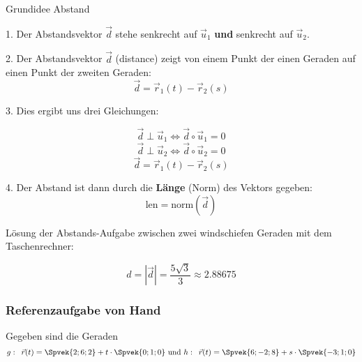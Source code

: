 \begin{rezept}{Grundidee Abstand}{}

  1. Der Abstandsvektor $\vec{d}$ stehe senkrecht auf $\vec{u}_1$
  \textbf{und} senkrecht auf $\vec{u}_2$.

  2. Der Abstandsvektor $\vec{d}$ (distance) zeigt von einem Punkt der einen Geraden auf
  einen Punkt der zweiten Geraden: $$\vec{d}=\vec{r}_1(t) - \vec{r}_2(s)$$

  3. Dies ergibt uns drei Gleichungen:

  $$\vec{d}\perp\vec{u}_1 \Longleftrightarrow{}  \vec{d}\circ{}\vec{u}_1 = 0$$
  $$\vec{d}\perp\vec{u}_2 \Longleftrightarrow{}  \vec{d}\circ{}\vec{u}_2 = 0$$
  $$\vec{d}=\vec{r}_1(t)-\vec{r}_2(s)$$

  4. Der Abstand ist dann durch die \textbf{Länge} (Norm) des Vektors gegeben:
  $$\text{len} = \text{norm}(\vec{d})$$
  
\end{rezept}
\newpage


Lösung der Abstands-Aufgabe zwischen zwei windschiefen Geraden mit dem
Taschenrechner:
\TRAINER{}


$$d = |\vec{d} | = \frac{5\sqrt{3}}{3} \approx 2.88675$$
\newpage
\subsubsection{Referenzaufgabe von Hand}

Gegeben sind die Geraden
$$g: \,\,\, \vec{r}(t) = \Spvek{2;6;2} + t\cdot{}\Spvek{0;1;0} \text{
  und }  h: \,\,\, \vec{r}(t) = \Spvek{6;-2;8} + s\cdot{}\Spvek{-3;1;0} $$


